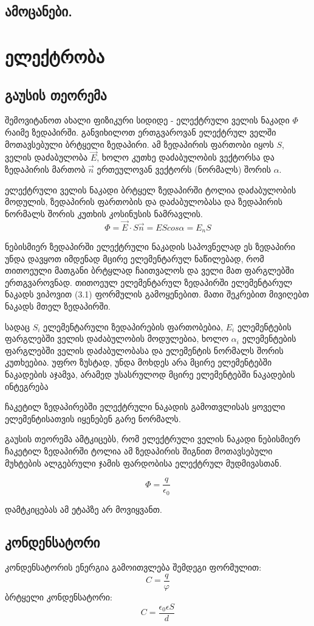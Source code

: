 \documentclass[a4paper]{book}
\begin{document}
\section{ამოცანები.}

\chapter{ელექტრობა}

\section{გაუსის თეორემა}
შემოვიტანოთ ახალი ფიზიკური სიდიდე - ელექტრული ველის ნაკადი $\Phi$ რაიმე ზედაპირში. განვიხილოთ ერთგვაროვან ელექტრულ ველში მოთავსებული ბრტყელი ზედაპირი. ამ ზედაპირის ფართობი იყოს $S$, ველის დაძაბულობა $\vec{E}$, ხოლო კუთხე დაძაბულობის ვექტორსა და ზედაპირის მართობ $\vec{n}$ ერთეულოვან ვექტორს (ნორმალს) შორის $\alpha$.

ელექტრული ველის ნაკადი ბრტყელ ზედაპირში ტოლია დაძაბულობის მოდულის, ზედაპირის ფართობის და დაძაბულობასა და ზედაპირის ნორმალს შორის კუთხის კოსინუსის ნამრავლის.
	$$\Phi = \vec{E}\cdot S\vec{n}=EScos\alpha=E_n S$$

ნებისმიერ ზედაპირში ელექტრული ნაკადის საპოვნელად ეს ზედაპირი უნდა დავყოთ იმდენად მცირე ელემენტარულ ნაწილებად, რომ თითოეული მათგანი ბრტყლად ჩაითვალოს და ველი მათ ფარგლებში ერთგვაროვნად. თითოეულ ელემენტარულ ზედაპირში ელემენტარულ ნაკადს ვიპოვით (3.1) ფორმულის გამოყენებით. მათი შეკრებით მივიღებთ ნაკადს მთელ ზედაპირში.

სადაც $S_i$ ელემენტარული ზედაპირების ფართობებია, $E_i$ ელემენტების ფარგლებში ველის დაძაბულობის მოდულებია, ხოლო $\alpha_i$ ელემენტების ფარგლებში ველის დაძაბულობასა და ელემენტის ნორმალს შორის კუთხეებია. უფრო ზუსტად, უნდა მოხდეს არა მცირე ელემენტებში ნაკადების აჯამვა, არამედ უსასრულოდ მცირე ელემენტებში ნაკადების ინტეგრება

ჩაკეტილ ზედაპირებში ელექტრული ნაკადის გამოთვლისას ყოველი
ელემენტისათვის იყენებენ გარე ნორმალს.
 
გაუსის თეორემა ამტკიცებს, რომ ელექტრული ველის ნაკადი ნებისმიერ ჩაკეტილ ზედაპირში ტოლია ამ ზედაპირის შიგნით მოთავსებული მუხტების ალგებრული ჯამის ფარდობისა ელექტრულ მუდმივასთან.

$$\Phi = \frac{q}{\epsilon_0}$$

დამტკიცებას ამ ეტაპზე არ მოვიყვანთ.
\section{კონდენსატორი}
კონდენსატორის ენერგია გამოითვლება შემდეგი ფორმულით:
$$C = \frac{q}{\varphi}$$
ბრტყელი კონდენსატორი:
$$C = \frac{\epsilon_0 \epsilon S}{d}$$
\end{document}
